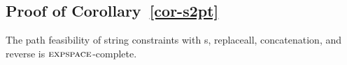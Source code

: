 



\subsection{Proof of Corollary~\ref{cor-s2pt}}

The path feasibility of string constraints with \FT{}s, replaceall, concatenation, and reverse is $\textsc{expspace}$-complete.











